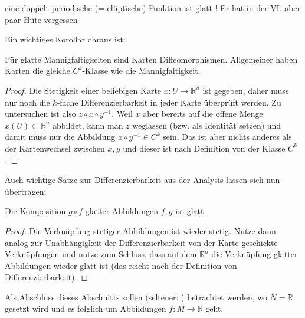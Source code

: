 \documentclass[../H_Analysis_main.tex]{subfiles}
\begin{document}


\begin{bsp}
eine doppelt periodische (= elliptische) Funktion ist glatt ! Er hat in der VL aber paar Hüte vergessen
\end{bsp}

Ein wichtiges Korollar daraus ist:
\begin{cor}\label{cor:kartendfb}
Für glatte Mannigfaltigkeiten sind Karten Diffeomorphismen. Allgemeiner haben Karten die gleiche $C^k$-Klasse wie die Mannigfaltigkeit.
\end{cor}
\begin{proof}
Die Stetigkeit einer beliebigen Karte $x: U \rightarrow \mathbb{R}^n$ ist gegeben, daher muss nur noch die $k$-fache Differenzierbarkeit in jeder Karte überprüft werden. Zu untersuchen ist also $z \circ x \circ y^{-1}$. Weil $x$ aber bereits auf die offene Menge $x(U) \subset \mathbb{R}^n$ abbildet, kann man $z$ weglassen (bzw. als Identität setzen) und damit muss nur die Abbildung $x \circ y^{-1} \in C^k$ sein. Das ist aber nichts anderes als der Kartenwechsel zwischen $x, y$ und dieser ist nach Definition von der Klasse $C^k$.
\end{proof}

Auch wichtige Sätze zur Differenzierbarkeit aus der Analysis lassen sich nun übertragen:
\begin{cor}[Verknüpfung]
Die Komposition $g \circ f$ glatter Abbildungen $f, g$ ist glatt.
\end{cor}

\begin{proof}
Die Verknüpfung stetiger Abbildungen ist wieder stetig. Nutze dann analog zur Unabhängigkeit der Differenzierbarkeit von der Karte geschickte Verknüpfungen und nutze zum Schluss, dass auf dem $\mathbb{R}^n$ die Verknüpfung glatter Abbildungen wieder glatt ist (das reicht nach der Definition von Differenzierbarkeit).
\end{proof}


Als Abschluss dieses Abschnitts sollen  (seltener: ) betrachtet werden, wo $N = \mathbb{R}$ gesetzt wird und es folglich um Abbildungen $f: M \rightarrow \mathbb{R}$ geht.
\end{document}
